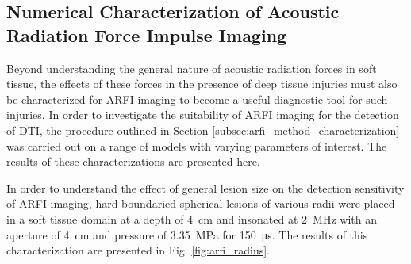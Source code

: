 			\begin{figure}[!htb]
				\centering
				\caption[]{}
				\label{fig:freq_pressure_maxDisp}
			\end{figure}

		\FloatBarrier
		\subsection{Numerical Characterization of Acoustic Radiation Force Impulse Imaging}
		\label{subsec:arfi_numerical_characterization}
			Beyond understanding the general nature of acoustic radiation forces in soft tissue, the effects of these forces in the presence of deep tissue injuries must also be characterized for ARFI imaging to become a useful diagnostic tool for such injuries. In order to investigate the suitability of ARFI imaging for the detection of DTI, the procedure outlined in Section \ref{subsec:arfi_method_characterization} was carried out on a range of models with varying parameters of interest. The results of these characterizations are presented here.

			In order to understand the effect of general lesion size on the detection sensitivity of ARFI imaging, hard-boundaried spherical lesions of various radii were placed in a soft tissue domain at a depth of \SI{4}{\cm} and insonated at \SI{2}{\MHz} with an aperture of \SI{4}{\cm} and pressure of \SI{3.35}{\MPa} for \SI{150}{\us}. The results of this characterization are presented in Fig. \ref{fig:arfi_radius}.

